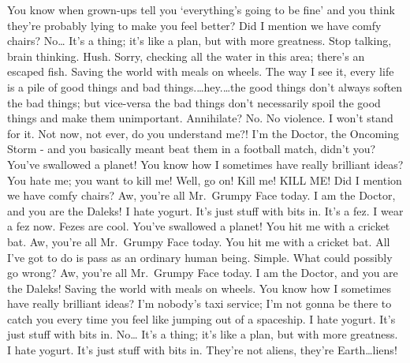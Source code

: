 You know when grown-ups tell you `everything's going to be fine' and you
think they're probably lying to make you feel better? Did I mention we
have comfy chairs? No\ldots{} It's a thing; it's like a plan, but with
more greatness. Stop talking, brain thinking. Hush. Sorry, checking all
the water in this area; there's an escaped fish. Saving the world with
meals on wheels. The way I see it, every life is a pile of good things
and bad things.\ldots{}hey.\ldots{}the good things don't always soften
the bad things; but vice-versa the bad things don't necessarily spoil
the good things and make them unimportant. Annihilate? No. No violence.
I won't stand for it. Not now, not ever, do you understand me?! I'm the
Doctor, the Oncoming Storm - and you basically meant beat them in a
football match, didn't you? You've swallowed a planet! You know how I
sometimes have really brilliant ideas? You hate me; you want to kill me!
Well, go on! Kill me! KILL ME! Did I mention we have comfy chairs? Aw,
you're all Mr.~Grumpy Face today. I am the Doctor, and you are the
Daleks! I hate yogurt. It's just stuff with bits in. It's a fez. I wear
a fez now. Fezes are cool. You've swallowed a planet! You hit me with a
cricket bat. Aw, you're all Mr.~Grumpy Face today. You hit me with a
cricket bat. All I've got to do is pass as an ordinary human being.
Simple. What could possibly go wrong? Aw, you're all Mr.~Grumpy Face
today. I am the Doctor, and you are the Daleks! Saving the world with
meals on wheels. You know how I sometimes have really brilliant ideas?
I'm nobody's taxi service; I'm not gonna be there to catch you every
time you feel like jumping out of a spaceship. I hate yogurt. It's just
stuff with bits in. No\ldots{} It's a thing; it's like a plan, but with
more greatness. I hate yogurt. It's just stuff with bits in. They're not
aliens, they're Earth\ldots{}liens!



